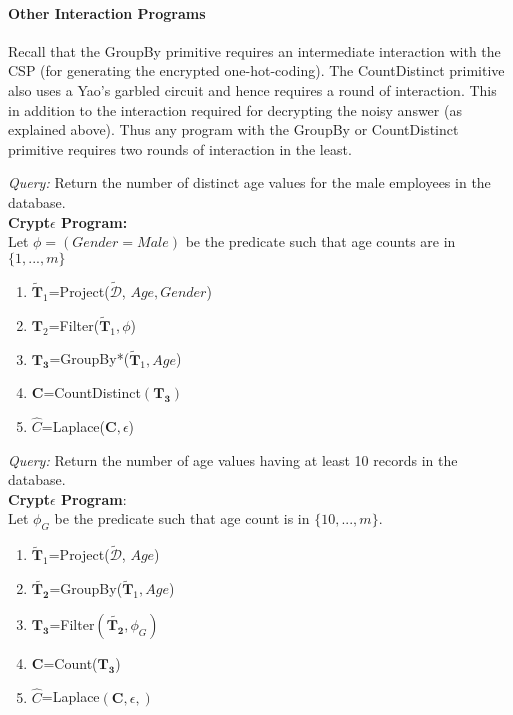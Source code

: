 \paragraph{\textbf{Other Interaction Programs}}
Recall that the \textsf{GroupBy} primitive requires an intermediate interaction with the \textsf{CSP} (for generating the encrypted one-hot-coding). The \textsf{CountDistinct} primitive also uses a Yao's garbled circuit and hence requires a round of interaction. This in addition to the interaction required for decrypting the noisy answer (as explained above). Thus any program with the \textsf{GroupBy} or \textsf{CountDistinct} primitive requires two rounds of interaction in the least. 
\begin{exmp}\textit{Query:} Return the number of distinct age values for the male employees in the database. \\ \textbf{Crypt$\epsilon$ Program:} \\Let  $\phi=(Gender=Male)$ be the predicate such that age counts are in $\{1,...,m\}$\end{exmp} \begin{enumerate}\item $\mathbf{\tilde{T}}_1$=\textsf{Project}($\boldsymbol{\tilde{\mathcal{D}}}$, $Age,Gender$) \item $\mathbf{T}_2$=\textsf{Filter}($\mathbf{\tilde{T}}_1,\phi$) \item $\mathbf{T_3}$=\textsf{GroupBy*}($\mathbf{\tilde{T}}_1,Age$)\item $\mathbf{C}$=\textsf{CountDistinct}$(\mathbf{T_3})$\item $\hat{C}$=\textsf{Laplace}($\mathbf{C},\epsilon$)\end{enumerate} \begin{exmp}\textit{Query: } Return the number of  age values having at least 10 records in the database. \\ \textbf{Crypt$\epsilon$ Program}:\\ Let $\phi_G$ be the predicate such that age count is in $\{10,...,m\}$. \end{exmp}\begin{enumerate}\item $\mathbf{\tilde{T}}_1$=\textsf{Project}($\boldsymbol{\tilde{\mathcal{D}}}$, $Age$) \item $\mathbf{\tilde{T_2}}$=\textsf{GroupBy}($\mathbf{\tilde{T}}_1,Age$)\item $\mathbf{T_3}$=\textsf{Filter}$(\mathbf{\tilde{T_2}},\phi_G)$\item $\mathbf{C}$=\textsf{Count}($\mathbf{T_3}$)\item $\hat{C}$=\textsf{Laplace}$(\mathbf{C},\epsilon,)$\end{enumerate}

